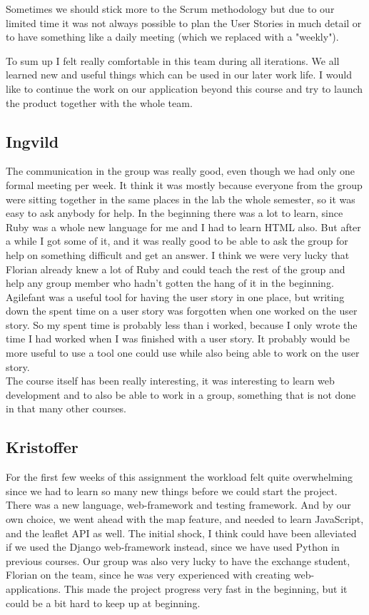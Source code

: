 \documentclass[a4paper]{article}
\begin{document}
\noindent
Sometimes we should stick more to the Scrum methodology but due to our limited time it was not always possible to plan the User Stories in much detail or to have something like a daily meeting (which we replaced with a "weekly").

\noindent
To sum up I felt really comfortable in this team during all iterations. We all learned new and useful things which can be used in our later work life. I would like to continue the work on our application beyond this course and try to launch the product together with the whole team.

\subsection{Ingvild}
The communication in the group was really good, even though we had only one formal meeting per week. It think it was mostly because everyone from the group were sitting together in the same places in the lab the whole semester, so it was easy to ask anybody for help. In the beginning there was a lot to learn, since Ruby was a whole new language for me and I had to learn HTML also. But after a while I got some of it, and it was really good to be able to ask the group for help on something difficult and get an answer. I think we were very lucky that Florian already knew a lot of Ruby and could teach the rest of the group and help any group member who hadn't gotten the hang of it in the beginning.\\

\noindent
Agilefant was a useful tool for having the user story in one place, but writing down the spent time on a user story was forgotten when one worked on the user story. So my spent time is probably less than i worked, because I only wrote the time I had worked when I was finished with a user story. It probably would be more useful to use a tool one could use while also being able to work on the user story. \\

\noindent
The course itself has been really interesting, it was interesting to learn web development and to  also be able to work in a group, something that is not done in that many other courses.

\subsection{Kristoffer}
\noindent
For the first few weeks of this assignment the workload felt quite overwhelming since we had to learn so many new things before we could start the project. There was a new language, web-framework and testing framework. And by our own choice, we went ahead with the map feature, and needed to learn JavaScript, and the leaflet API as well.  
The initial shock, I think could have been alleviated if we used the Django web-framework instead, since we have used Python in previous courses.
Our group was also very lucky to have the exchange student, Florian on the team, since he was very experienced with creating web-applications. This made the project progress very fast in the beginning, but it could be a bit hard to keep up at beginning. \\
\end{document}

